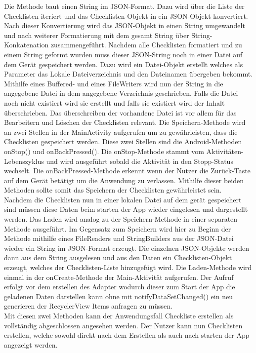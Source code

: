 Die Methode baut einen String im \ac{JSON}-Format. Dazu wird über die Liste der Checklisten iteriert und das Checklisten-Objekt in ein \ac{JSON}-Objekt konvertiert. Nach dieser Konvertierung wird das \ac{JSON}-Objekt in einen String umgewandelt und nach weiterer Formatierung mit dem gesamt String über String-Konkatenation zusammengeführt. Nachdem alle Checklisten formatiert und zu einem String geformt wurden muss dieser \glqq \ac{JSON}-String\grqq{} noch in einer Datei auf dem Gerät gespeichert werden. Dazu wird ein Datei-Objekt erstellt welches als Parameter das Lokale Dateiverzeichnis und den Dateinamen übergeben bekommt. Mithilfe eines Buffered- und eines FileWriters wird nun der String in die angegebene Datei in dem angegebene Verzeichnis geschrieben. Falls die Datei noch nicht existiert wird sie erstellt und falls sie existiert wird der Inhalt überschrieben. Das überschreiben der vorhandene Datei ist vor allem für das Bearbeitern und Löschen der Checklisten relevant. Die Speichern-Methode wird an zwei Stellen in der MainActivity aufgerufen um zu gewährleisten, dass die Checklisten gespeichert werden. Diese zwei Stellen sind die Android-Methoden onStop() und onBackPressed(). Die onStop-Methode stammt vom Aktivitäten-Lebenszyklus und wird ausgeführt sobald die Aktivität in den Stopp-Status wechselt. Die onBackPressed-Methode erkennt wenn der Nutzer die Zurück-Taste auf dem Gerät betätigt um die Anwendung zu verlassen. Mithilfe dieser beiden Methoden sollte somit das Speichern der Checklisten gewährleistet sein.\\
Nachdem die Checklisten nun in einer lokalen Datei auf dem gerät gespeichert sind müssen diese Daten beim starten der App wieder eingelesen und dargestellt werden. Das Laden wird analog zu der Speichern-Methode in einer separaten Methode ausgeführt. Im Gegensatz zum Speichern wird hier zu Beginn der Methode mithilfe eines FileReaders und StringBuilders aus der \ac{JSON}-Datei wieder ein String im \ac{JSON}-Format erzeugt. Die einzelnen \ac{JSON}-Objekte werden dann aus dem String ausgelesen und aus den Daten ein Checklisten-Objekt erzeugt, welches der Checklisten-Liste hinzugefügt wird. Die Laden-Methode wird einmal in der onCreate-Methode der Main-Aktivität aufgerufen. Der Aufruf erfolgt vor dem erstellen des Adapter wodurch dieser zum Start der App die geladenen Daten darstellen kann ohne mit notifyDataSetChanged() ein neu generieren der RecyclerView Items anfragen zu müssen.\\
Mit diesen zwei Methoden kann der Anwendungsfall \glqq Checkliste erstellen\grqq{} als vollständig abgeschlossen angesehen werden. Der Nutzer kann nun Checklisten erstellen, welche sowohl direkt nach dem Erstellen als auch nach starten der App angezeigt werden.

